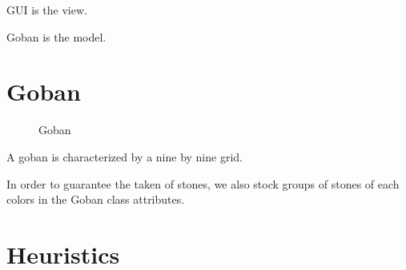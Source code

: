 \documentclass[12pt,a4paper,utf8x]{report}
\begin{document}
\begin{onehalfspace}
	GUI is the view.
	
	Goban is the model.
	
	\clearpage
	
	\section{Goban}
	
	\begin{figure}[h!]
		\centering
		\caption{Goban}
		\label{gbn} 
	\end{figure}
	
	A goban is characterized by a nine by nine grid.
	
	In order to guarantee the taken of stones, we also stock groups of stones of each colors in the Goban class attributes.
	
	\clearpage
	
	\section{Heuristics}
	

\end{onehalfspace}
\end{document}
